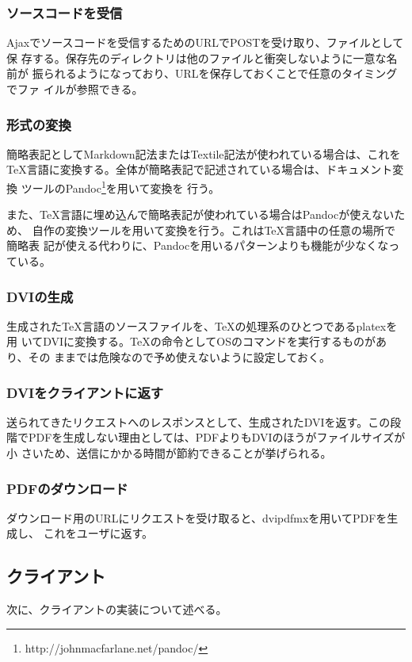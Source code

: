 \documentclass[a4j,9pt,titlepage]{jsarticle}
\begin{document}
\subsubsection{ソースコードを受信}
Ajaxでソースコードを受信するためのURLでPOSTを受け取り、ファイルとして保
存する。保存先のディレクトリは他のファイルと衝突しないように一意な名前が
振られるようになっており、URLを保存しておくことで任意のタイミングでファ
イルが参照できる。

\subsubsection{形式の変換}
簡略表記としてMarkdown記法またはTextile記法が使われている場合は、これを
TeX言語に変換する。全体が簡略表記で記述されている場合は、ドキュメント変換
ツールのPandoc\footnote{http://johnmacfarlane.net/pandoc/}を用いて変換を
行う。

また、TeX言語に埋め込んで簡略表記が使われている場合はPandocが使えないため、
自作の変換ツールを用いて変換を行う。これはTeX言語中の任意の場所で簡略表
記が使える代わりに、Pandocを用いるパターンよりも機能が少なくなっている。

\subsubsection{DVIの生成}
生成されたTeX言語のソースファイルを、TeXの処理系のひとつであるplatexを用
いてDVIに変換する。TeXの命令としてOSのコマンドを実行するものがあり、その
ままでは危険なので予め使えないように設定しておく。

\subsubsection{DVIをクライアントに返す}
送られてきたリクエストへのレスポンスとして、生成されたDVIを返す。この段
階でPDFを生成しない理由としては、PDFよりもDVIのほうがファイルサイズが小
さいため、送信にかかる時間が節約できることが挙げられる。

\subsubsection{PDFのダウンロード}
ダウンロード用のURLにリクエストを受け取ると、dvipdfmxを用いてPDFを生成し、
これをユーザに返す。

\subsection{クライアント}
次に、クライアントの実装について述べる。
\end{document}

